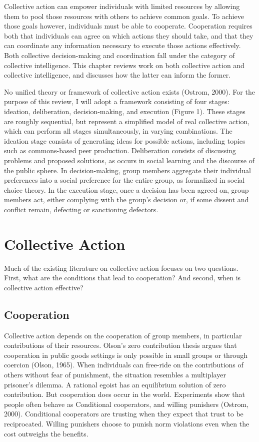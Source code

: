 Collective action can empower individuals with limited resources by allowing them to pool those resources with others to achieve common goals. To achieve those goals however, individuals must be able to cooperate. Cooperation requires both that individuals can agree on which actions they should take, and that they can coordinate any information necessary to execute those actions effectively. Both collective decision-making and coordination fall under the category of collective intelligence. This chapter reviews work on both collective action and collective intelligence, and discusses how the latter can inform the former.

No unified theory or framework of collective action exists (Ostrom, 2000). For the purpose of this review, I will adopt a framework consisting of four stages: ideation, deliberation, decision-making, and execution (Figure 1). These stages are roughly sequential, but represent a simplified model of real collective action, which can perform all stages simultaneously, in varying combinations. The ideation stage consists of generating ideas for possible actions, including topics such as commons-based peer production. Deliberation consists of discussing problems and proposed solutions, as occurs in social learning and the discourse of the public sphere. In decision-making, group members aggregate their individual preferences into a social preference for the entire group, as formalized in social choice theory. In the execution stage, once a decision has been agreed on, group members act, either complying with the group's decision or, if some dissent and conflict remain, defecting or sanctioning defectors.

\section{Collective Action}
Much of the existing literature on collective action focuses on two questions. First, what are the conditions that lead to cooperation? And second, when is collective action effective?

\subsection{Cooperation}
Collective action depends on the cooperation of group members, in particular contributions of their resources. Olson's zero contribution thesis argues that cooperation in public goods settings is only possible in small groups or through coercion (Olson, 1965). When individuals can free-ride on the contributions of others without fear of punishment, the situation resembles a multiplayer prisoner's dilemma. A rational egoist has an equilibrium solution of zero contribution. But cooperation does occur in the world. Experiments show that people often behave as Conditional cooperators, and willing punishers (Ostrom, 2000). Conditional cooperators are trusting when they expect that trust to be reciprocated. Willing punishers choose to punish norm violations even when the cost outweighs the benefits.

